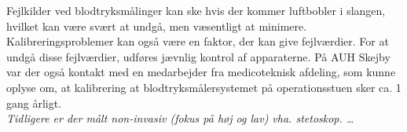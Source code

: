 \newline
Fejlkilder ved blodtryksmålinger kan ske hvis der kommer luftbobler i slangen, hvilket kan være svært at undgå, men væsentligt at minimere. Kalibreringsproblemer kan også være en faktor, der kan give fejlværdier. For at undgå disse fejlværdier, udføres jævnlig kontrol af apparaterne.  
På AUH Skejby var der også kontakt med en medarbejder fra medicoteknisk afdeling, som kunne oplyse om, at kalibrering at blodtryksmålersystemet på operationsstuen sker ca. 1 gang årligt. \\
\newline
\textit{Tidligere er der målt non-invasiv (fokus på høj og lav) vha. stetoskop. …}

